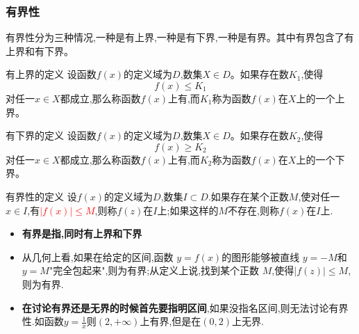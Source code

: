 \documentclass[12pt, a4paper, oneside, UTF8]{ctexbook}  %
\begin{document}
\begin{sloppypar}
    \subsubsection{有界性}
    有界性分为三种情况,一种是有上界,一种是有下界,一种是有界。其中有界包含了有上界和有下界。
    \begin{defn}{有上界的定义}{}
        设函数$f(x)$的定义域为$D$,数集$X \in D$。如果存在数$K_1$,使得
        $$
            f(x) \le K_1
        $$
        对任一$x \in X$都成立,那么称函数$f(x)$上有,而$K_1$称为函数$f(x)$在$X$上的一个上界。
    \end{defn}
    \begin{defn}{有下界的定义}{}
        设函数$f(x)$的定义域为$D$,数集$X \in D$。如果存在数$K_2$,使得
        $$
            f(x) \geq  K_2
        $$
        对任一$x \in X$都成立,那么称函数$f(x)$上有,而$K_2$称为函数$f(x)$在$X$上的一个下界。
    \end{defn}
    \begin{defn}{有界性的定义}{}
        设$f(x)$的定义域为$D$,数集$I \subset D$.如果存在某个正数$M$,使对任一$x \in I$,有\textcolor{red}{$|f(x)| \leqslant M$},则称$f(z)$在$I$上;如果这样的$M$不存在,则称$f(x)$在$I$上.
    \end{defn}
    \begin{itemize}
        \item \textbf{有界是指,同时有上界和下界}
        \item 从几何上看,如果在给定的区间,函数 $y=f(x)$的图形能够被直线 $y=-M$和 $y=M$"完全包起来",则为有界;从定义上说,找到某个正数 $M$,使得$|f(z)| \leqslant M$,则为有界.
        \item \textbf{在讨论有界还是无界的时候首先要指明区间},如果没指名区间,则无法讨论有界性.如函数$y=\frac{1}{x}$则$(2,+\infty)$上有界,但是在$(0,2)$上无界.
    \end{itemize}

\end{sloppypar}
\end{document}

